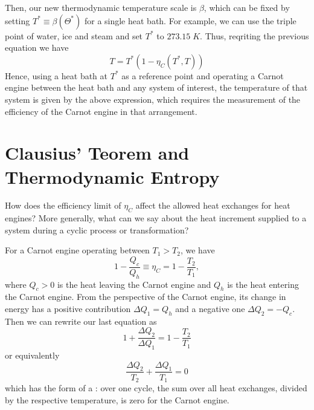 \documentclass[12pt, a4paper, oneside, openright, titlepage]{book}
\begin{document}
Then, our new thermodynamic temperature scale is $\beta$, which can be fixed by setting $T^*\equiv \beta(\Theta^*)$ for a single heat bath. For example, we can use the triple point of water, ice and steam and set $T^*$ to $273.15\;K$. Thus, reqriting the previous equation we have \begin{equation*}
    T = T^*(1-\eta_C(T^*,T))
\end{equation*}
Hence, using a heat bath at $T^*$ as a reference point and operating a Carnot engine between the heat bath and any system of interest, the temperature of that system is given by the above expression, which requires the measurement of the efficiency of the Carnot engine in that arrangement. 




\section{Clausius' Teorem and Thermodynamic Entropy}

\begin{qst}
    How does the efficiency limit of $\eta_C$ affect the allowed heat exchanges for heat engines? More generally, what can we say about the heat increment supplied to a system during a cyclic process or transformation?
\end{qst}

For a Carnot engine operating between $T_1 > T_2$, we have \begin{equation*}
    1 - \frac{Q_c}{Q_h}\equiv \eta_C = 1-\frac{T_2}{T_1}, 
\end{equation*}
where $Q_c > 0$ is the heat leaving the Carnot engine and $Q_h$ is the heat entering the Carnot engine. From the perspective of the Carnot engine, its change in energy has a positive contribution $\Delta Q_1 = Q_h$ and a negative one $\Delta Q_2 = -Q_c$. Then we can rewrite our last equation as \begin{equation*}
    1+\frac{\Delta Q_2}{\Delta Q_1} = 1-\frac{T_2}{T_1}
\end{equation*}
or equivalently \begin{equation*}
    \frac{\Delta Q_2}{T_2} + \frac{\Delta Q_1}{T_1} = 0
\end{equation*}
which has the form of a : over one cycle, the sum over all heat exchanges, divided by the respective temperature, is zero for the Carnot engine.
\end{document}
